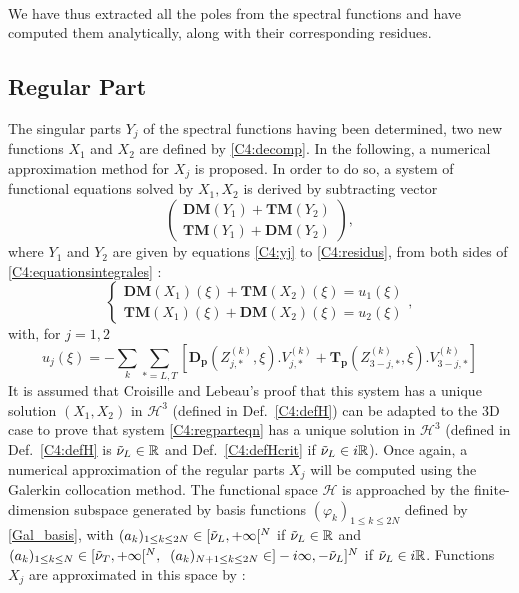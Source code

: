 \paragraph*{}
We have thus extracted all the poles from the spectral functions and have computed them analytically, along with their corresponding residues.

\subsection{Regular Part}
\label{C4:regpart}
The singular parts $Y_j$ of the spectral functions having been determined, two new functions $X_1$ and $X_2$ are defined by \eqref{C4:decomp}. In the following, a numerical approximation method for $X_j$ is proposed. In order to do so, a system of functional equations solved by $X_1, X_2$ is derived by subtracting vector
\begin{equation}
\begin{pmatrix}
\textbf{DM}(Y_1)+\textbf{TM}(Y_2) \\
\textbf{TM}(Y_1)+\textbf{DM}(Y_2)
\end{pmatrix},
\end{equation}
where $Y_1$ and $Y_2$ are given by equations \eqref{C4:yj} to \eqref{C4:residus}, from both sides of \eqref{C4:equationsintegrales} :
\begin{equation}
\left\{ 
\begin{matrix}
\mathbf{DM}(X_1)(\xi)+\textbf{TM}(X_2)(\xi)=u_1(\xi)\\
\textbf{TM}(X_1)(\xi)+\textbf{DM}(X_2)(\xi)=u_2(\xi)
\end{matrix}
\right.,
\label{C4:regparteqn}
\end{equation}
with, for $j=1,2$
\begin{equation}
u_j(\xi)=-\sum_k \sum_{*=L,T} \left[ \mathbf{D_p}(Z_{j,*}^{(k)},\xi).V_{j,*}^{(k)}+\mathbf{T_p}(Z_{3-j,*}^{(k)},\xi).V_{3-j,*}^{(k)}\right]
\label{C4:scndmembre}
\end{equation}
It is assumed that Croisille and Lebeau's \cite{CroisilleLebeau} proof that this system has a unique solution $(X_1,X_2)$ in $\mathcal{H}^3$ (defined in Def.~\ref{C4:defH}) can be adapted to the 3D case to prove that system \eqref{C4:regparteqn} has a unique solution in $\mathcal{H}^3$ (defined in Def.~\ref{C4:defH} is $\tilde{\nu}_L \in \mathbb{R}$ and Def.~\ref{C4:defHcrit} if $\tilde{\nu}_L \in i\mathbb{R}$). Once again, a numerical approximation of the regular parts $X_j$ will be computed using the Galerkin collocation method. The functional space $\mathcal{H}$ is approached by the finite-dimension subspace generated by basis functions $(\varphi_k)_{1 \leq k \leq 2N}$ defined by \eqref{Gal_basis}, with $(a_k)_{1 \leq k \leq 2N} \in \lbrack \tilde{\nu}_L, + \infty \lbrack^N$ if $\tilde{\nu}_L \in \mathbb{R}$ and $(a_k)_{1 \leq k \leq N} \in \lbrack \tilde{\nu}_T, + \infty \lbrack^N ,\; \; (a_k)_{N+1\leq k \leq 2N} \in \rbrack -i\infty, -\tilde{\nu}_L\rbrack^N$ if $\tilde{\nu}_L \in i\mathbb{R}$. Functions $X_j$ are approximated in this space by :
